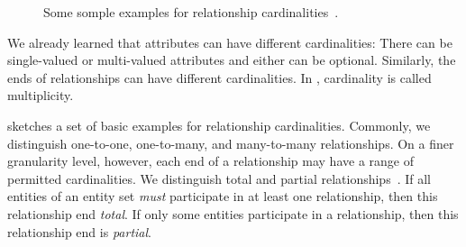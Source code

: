 %
%
%
\begin{figure}%
%
%
%
\floatSep%
%
%
%
\floatSep%
%
%
%
\caption{Some somple examples for relationship cardinalities~\cite{SS2005EIDDDFDB:CDDICAMP,V1999C5DMS:CDUTERM}.}%
\label{fig:relationshipCardinalities}%
%
\end{figure}%
%
We already learned that attributes can have different cardinalities:
There can be single-valued or multi-valued attributes and either can be optional.
Similarly, the ends of relationships can have different cardinalities.
In , cardinality is called multiplicity.

 sketches a set of basic examples for relationship cardinalities.
Commonly, we distinguish one-to-one, one-to-many, and many-to-many relationships.
On a finer granularity level, however, each end of a relationship may have a range of permitted cardinalities.
We distinguish total and partial relationships~\cite{P2006CITRD:ERMI,V1999C5DMS:CDUTERM}.
If all entities of an entity set \emph{must} participate in at least one relationship, then this relationship end \emph{total}.
If only some entities participate in a relationship, then this relationship end is \emph{partial}.

